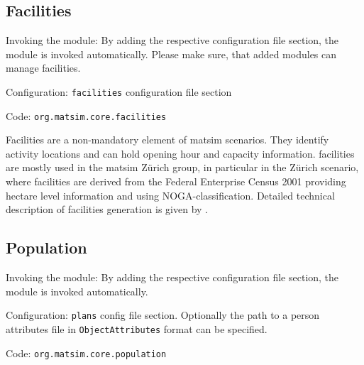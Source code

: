 \subsection{Facilities}
\label{sec:facilities}
\begin{compactitem}
\item Invoking the module: By adding the respective configuration file section, the module is invoked automatically. Please make sure, that added modules can manage facilities.
\item Configuration: \lstinline|facilities| configuration file section
\item Code: \lstinline|org.matsim.core.facilities|
\end{compactitem}

Facilities are a non-mandatory element of \gls{matsim} scenarios. They identify activity locations and can hold opening hour and capacity information. facilities are mostly used in the \gls{matsim} Zürich group, in particular in the Zürich scenario, where facilities are derived from the Federal Enterprise Census 2001 \citep[][]{SwissEnterpriseCensus_manual_2001} providing hectare level information and using NOGA-classification. Detailed technical description of facilities generation is given by \citet[][]{Meister_TechRep_IVT_2008, Meister_unpub_IVT_2007}.



\subsection{Population}
\label{sec:population}
\begin{compactitem}
\item Invoking the module: By adding the respective configuration file section, the module is invoked automatically.
\item Configuration: \lstinline|plans| config file section. Optionally the path to a person attributes file in \lstinline|ObjectAttributes| format can be specified.
\item Code: \lstinline|org.matsim.core.population|
\end{compactitem}


